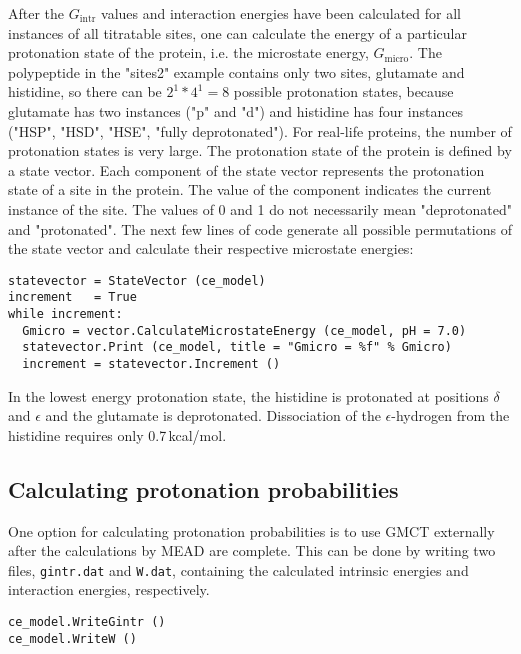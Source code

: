 \documentclass[a4paper,11pt]{article}
\begin{document}
{After the $G_{\mathrm{intr}}$ values and interaction energies have been calculated 
for all instances of all titratable sites, 
one can calculate the energy of a particular protonation state of the protein, i.e. 
the microstate energy, $G_{\mathrm{micro}}$.
%
The polypeptide in the "sites2" example contains only two sites, 
glutamate and histidine,
so there can be $2^1 * 4^1 = 8$ possible protonation states, because glutamate has two
instances ("p" and "d") and histidine has four instances ("HSP", "HSD", "HSE", "fully deprotonated").
%
For real-life proteins, the number of protonation states is very large.
%
The protonation state of the protein is defined by a state vector.
%
Each component of the state vector represents the protonation state of a site in the protein.
%
The value of the component indicates the current instance of the site.
%
The values of 0 and 1 do not necessarily mean "deprotonated" and "protonated".
%
The next few lines of code generate all possible permutations of the state vector and calculate
their respective microstate energies:

{\footnotesize \begin{lstlisting}
statevector = StateVector (ce_model)
increment   = True
while increment:
  Gmicro = vector.CalculateMicrostateEnergy (ce_model, pH = 7.0)
  statevector.Print (ce_model, title = "Gmicro = %f" % Gmicro)
  increment = statevector.Increment ()
\end{lstlisting} }

\bigskip
In the lowest energy protonation state, the histidine is protonated at 
positions $\delta$ and $\epsilon$ and the glutamate is deprotonated.
%
Dissociation of the $\epsilon$-hydrogen from the histidine requires only 0.7\,kcal/mol.


\subsection{Calculating protonation probabilities}
One option for calculating protonation probabilities is to use GMCT externally after 
the calculations by MEAD are complete.
%
This can be done by writing two files, \texttt{gintr.dat} and \texttt{W.dat}, containing 
the calculated intrinsic energies and interaction energies, respectively.

{\footnotesize \begin{lstlisting}
ce_model.WriteGintr ()
ce_model.WriteW ()
\end{lstlisting} }


}
\end{document}
